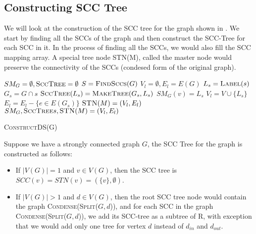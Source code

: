 \subsection{Constructing SCC Tree}

We will look at the construction of the SCC tree for the graph shown in \figureref{\ref{fig:graph1}}.
We start by finding all the SCCs of the graph and then construct the SCC-Tree for each SCC in it.
In the process of finding all the SCCs, we would also fill the SCC mapping array. 
A special tree node \textsc{STN}(M), called the master node would preserve the connectivity of the SCCs (condesed form of the original graph).

\begin{algorithm}[H]
    \SetAlgoLined
    $SM_{G} = \emptyset, \textsc{SccTree} = \emptyset$\;
    $S = \textsc{FindSccs}(G)$\;
    $V_l = \emptyset, E_l = E(G)$\;
     {
        $L_s = \textsc{Label}(s)$\;
        $G_s = G \cap s$\;
        $\textsc{SccTree}(L_s) = \textsc{MakeTree}(G_s, L_s)$\;
         {
            $SM_{G}(v) = L_s$\;
        }
        $V_l = V \cup \{L_s\}$\;
        $E_l = E_l - \{e \in E(G_s)\}$\;
    }
    $\textsc{STN}(M) = (V_l, E_l)$\;
    \Return $SM_{G}, \textsc{SccTree}s, \textsc{STN}(M) = (V_l, E_l)$\;

    \caption{\textsc{ConstructDS}(G)}
\end{algorithm}

Suppose we have a strongly connected graph $G$, the SCC Tree for the graph is constructed as follows:
\begin{itemize}
    \item If $|V(G)| = 1$ and $v \in V(G)$, then the SCC tree is $SCC(v) = STN(v) = (\{v\}, \emptyset)$.
    \item If $|V(G)| > 1$ and $d \in V(G)$, then the root SCC tree node would contain the graph \textsc{Condense}(\textsc{Split}($G, d$)), 
    and for each SCC in the graph \textsc{Condense}(\textsc{Split}($G, d$)), we add its SCC-tree as a subtree of R, with 
    exception that we would add only one tree for vertex $d$ instead of $d_{in}$ and $d_{out}$.
\end{itemize}

